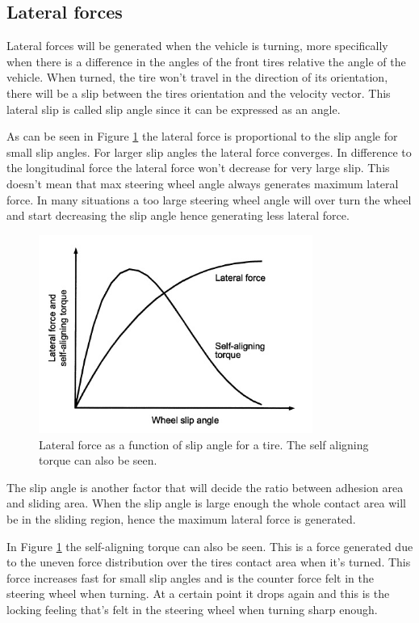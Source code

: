 \subsection{Lateral forces}
Lateral forces will be generated when the vehicle is turning, more specifically when there is a difference in the angles of the front tires relative the angle of the vehicle. When turned, the tire won't travel in the direction of its orientation, there will be a slip between the tires orientation and the velocity vector. This lateral slip is called slip angle since it can be expressed as an angle.

As can be seen in Figure \ref{slipangle_latforce} the lateral force is proportional to the slip angle for small slip angles. For larger slip angles the lateral force converges. In difference to the longitudinal force the lateral force won't decrease for very large slip. This doesn't mean that max steering wheel angle always generates maximum lateral force. In many situations a too large steering wheel angle will over turn the wheel and start decreasing the slip angle hence generating less lateral force.
\begin{figure}[h]
	\centering
	\includegraphics[width=0.8\textwidth]{Pictures/slipangle_latforce}
	\caption{Lateral force as a function of slip angle for a tire. The self aligning torque can also be seen. \cite{sae2004}}
	\label{slipangle_latforce}
\end{figure}

The slip angle is another factor that will decide the ratio between adhesion area and sliding area. When the slip angle is large enough the whole contact area will be in the sliding region, hence the maximum lateral force is generated.

In Figure \ref{slipangle_latforce} the self-aligning torque can also be seen. This is a force generated due to the uneven force distribution over the tires contact area when it's turned. This force increases fast for small slip angles and is the counter force felt in the steering wheel when turning. At a certain point it drops again and this is the locking feeling that's felt in the steering wheel when turning sharp enough.

